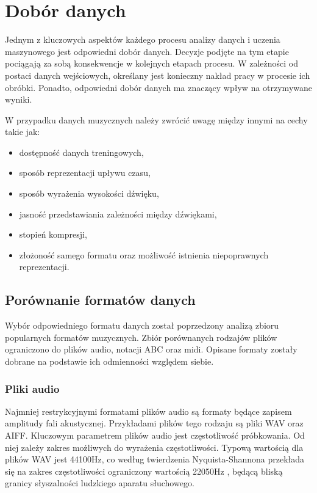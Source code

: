 \chapter {Dobór danych}\label{chap:data}
{
    Jednym z\,\,kluczowych aspektów każdego procesu analizy danych i\,\,uczenia maszynowego
    jest odpowiedni dobór danych. Decyzje podjęte na tym etapie pociągają za sobą 
    konsekwencje w\,\,kolejnych etapach procesu. W\,\,zależności od postaci danych wejściowych,
    określany jest konieczny nakład pracy w\,\,procesie ich obróbki. 
    Ponadto, odpowiedni dobór danych ma znaczący wpływ na otrzymywane wyniki.

    W\,\,przypadku danych muzycznych należy zwrócić uwagę między innymi na cechy takie jak:
    \begin{itemize}
        \setlength\itemsep{-0.5em}
        \item dostępność danych treningowych,
        \item sposób reprezentacji upływu czasu,
        \item sposób wyrażenia wysokości dźwięku,
        \item jasność przedstawiania zależności między dźwiękami,
        \item stopień kompresji,
        \item złożoność samego formatu oraz możliwość istnienia niepoprawnych reprezentacji.
    \end{itemize}

    \section{Porównanie formatów danych}
    {
        Wybór odpowiedniego formatu danych został poprzedzony analizą zbioru popularnych formatów muzycznych.
        Zbiór porównanych rodzajów plików ograniczono do plików audio, notacji ABC oraz midi.
        Opisane formaty zostały dobrane na podstawie ich odmienności względem siebie.

        \subsection{Pliki audio}
        {
            Najmniej restrykcyjnymi formatami plików audio są formaty będące zapisem
            amplitudy fali akustycznej. Przykładami plików tego rodzaju są pliki WAV
            oraz AIFF.
            Kluczowym parametrem plików audio jest częstotliwość próbkowania. Od niej
            zależy zakres możliwych do wyrażenia częstotliwości. Typową wartością dla plików
            WAV jest 44100Hz, co według twierdzenia Nyquista-Shannona przekłada się na zakres
            częstotliwości ograniczony wartością 22050Hz \cite{Shannon1949CommunicationIT}, będącą bliską granicy słyszalności
            ludzkiego aparatu słuchowego. 

}}}
